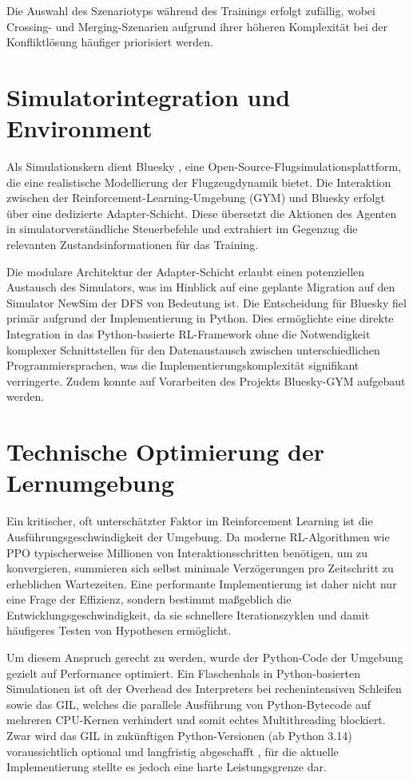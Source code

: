 Die Auswahl des Szenariotyps während des Trainings erfolgt zufällig, wobei Crossing\hyp{} und Merging\hyp{}Szenarien aufgrund ihrer höheren Komplexität bei der Konfliktlösung häufiger priorisiert werden.

\section{Simulatorintegration und Environment}
Als Simulationskern dient Bluesky \cite{bluesky}, eine Open\hyp{}Source\hyp{}Flugsimulationsplattform, die eine realistische Modellierung der Flugzeugdynamik bietet.
Die Interaktion zwischen der Reinforcement\hyp{}Learning\hyp{}Umgebung (\acs{GYM}) und Bluesky erfolgt über eine dedizierte Adapter\hyp{}Schicht. Diese übersetzt die Aktionen des Agenten in simulatorverständliche Steuerbefehle und extrahiert im Gegenzug die relevanten Zustandsinformationen für das Training.
\medskip

Die modulare Architektur der Adapter\hyp{}Schicht erlaubt einen potenziellen Austausch des Simulators, was im Hinblick auf eine geplante Migration auf den Simulator NewSim der \ac{DFS} von Bedeutung ist.
Die Entscheidung für Bluesky fiel primär aufgrund der Implementierung in Python. 
Dies ermöglichte eine direkte Integration in das Python\hyp{}basierte \ac{RL}\hyp{}Framework ohne die Notwendigkeit komplexer Schnittstellen für den Datenaustausch zwischen unterschiedlichen Programmiersprachen, was die Implementierungskomplexität signifikant verringerte.
Zudem konnte auf Vorarbeiten des Projekts Bluesky\hyp{}\ac{GYM} \cite{bluesky-gym} aufgebaut werden.

\section{Technische Optimierung der Lernumgebung}
Ein kritischer, oft unterschätzter Faktor im Reinforcement Learning ist die Ausführungsgeschwindigkeit der Umgebung. Da moderne \ac{RL}-Algorithmen wie \ac{PPO} typischerweise Millionen von Interaktionsschritten benötigen, um zu konvergieren, summieren sich selbst minimale Verzögerungen pro Zeitschritt zu erheblichen Wartezeiten. Eine performante Implementierung ist daher nicht nur eine Frage der Effizienz, sondern bestimmt maßgeblich die Entwicklungsgeschwindigkeit, da sie schnellere Iterationszyklen und damit häufigeres Testen von Hypothesen ermöglicht.
\medskip

Um diesem Anspruch gerecht zu werden, wurde der Python\hyp{}Code der Umgebung gezielt auf Performance optimiert. Ein Flaschenhals in Python\hyp{}basierten Simulationen ist oft der Overhead des Interpreters bei rechenintensiven Schleifen sowie das \ac{GIL}, welches die parallele Ausführung von Python\hyp{}Bytecode auf mehreren CPU\hyp{}Kernen verhindert und somit echtes Multithreading blockiert. Zwar wird das \ac{GIL} in zukünftigen Python-Versionen (ab Python 3.14) voraussichtlich optional und langfristig abgeschafft \cite{Python314WhatsNew}, für die aktuelle Implementierung stellte es jedoch eine harte Leistungsgrenze dar. 
\medskip

